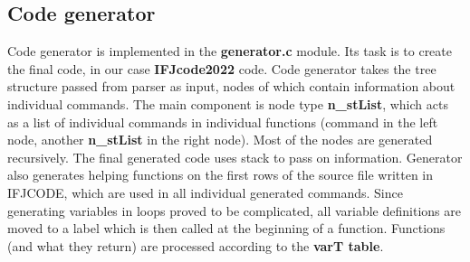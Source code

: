 \documentclass{article}
\begin{document}
\subsection{Code generator}
Code generator is implemented in the \textbf{generator.c} module. Its task is to create the final code, in our case \textbf{IFJcode2022} code. Code generator takes the tree structure passed from parser as input, nodes of which contain information about individual commands. The main component is node type \textbf{n\_stList}, which acts as a list of individual commands in individual functions (command in the left node, another \textbf{n\_stList} in the right node). 
Most of the nodes are generated recursively. The final generated code uses stack to pass on information.
Generator also generates helping functions on the first rows of the source file written in IFJCODE, which are used in all individual generated commands.
Since generating variables in loops proved to be complicated, all variable definitions are moved to a label which is then called at the beginning of a function. Functions (and what they return) are processed according to the \textbf{varT table}.
\newpage
\end{document}
